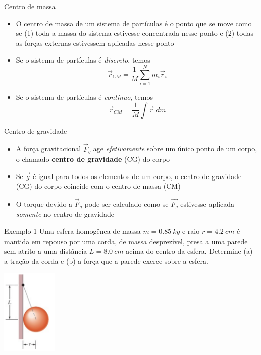 \begin{frame}{Centro de massa}
    \begin{itemize}
        \item O centro de massa de um sistema de partículas é o ponto que se move como se (1) toda a massa do sistema estivesse
            concentrada nesse ponto e (2) todas as forças externas estivessem aplicadas nesse ponto
        \item Se o sistema de partículas é \textit{discreto}, temos
            \[
                \vec{r}_{CM} = \frac{1}{M} \sum_{i=1}^{N} m_i \vec{r}_i
            \]
        \item Se o sistema de partículas é \textit{contínuo}, temos
            \[
                \vec{r}_{CM} = \frac{1}{M} \int \vec{r}\; dm
            \]
    \end{itemize}
\end{frame}

\begin{frame}[c]{Centro de gravidade}
    \begin{itemize}
        \item A força gravitacional \( \vec{F}_g\) age \textit{efetivamente} sobre um único ponto de um corpo, o chamado \textbf{centro de
        gravidade} (CG) do corpo
    \item Se \( \vec{g}\) é igual para todos os elementos de um corpo, o centro de gravidade (CG) do corpo coincide com o centro
        de massa (CM)

    \item O torque devido a \(\vec{F}_g\) pode ser calculado como se \(\vec{F_g}\) estivesse aplicada \textit{somente} no centro de gravidade
    \end{itemize}
\end{frame}

\begin{frame}{Exemplo 1}
    Uma esfera homogênea de massa \( m = \SI{0.85}{kg} \) e raio \(r = \SI{4.2}{cm}\) é mantida em repouso
    por uma corda, de massa desprezível, presa a uma parede sem atrito a uma distância \(L = \SI{8.0}{cm}\) acima do
    centro da esfera. Determine (a) a tração da corda e (b) a força que a parede exerce sobre a esfera.
    \begin{center}
        \includegraphics[width=0.2\textwidth]{images/bolapendurada}
    \end{center}
\end{frame}

